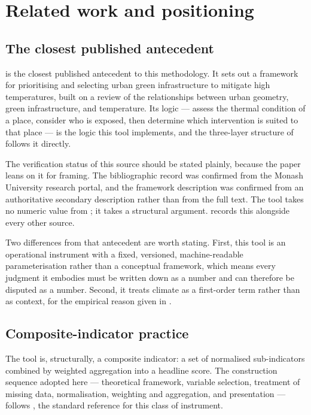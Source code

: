 \section{Related work and positioning}
\label{sec:related}

\subsection{The closest published antecedent}

\textcite{norton2015} is the closest published antecedent to this methodology.
It sets out a framework for prioritising and selecting urban green
infrastructure to mitigate high temperatures, built on a review of the
relationships between urban geometry, green infrastructure, and temperature. Its
logic --- assess the thermal condition of a place, consider who is exposed,
then determine which intervention is suited to that place --- is the logic this
tool implements, and the three-layer structure of  follows
it directly.

The verification status of this source should be stated plainly, because the
paper leans on it for framing. The bibliographic record was confirmed from the
Monash University research portal, and the framework description was confirmed
from an authoritative secondary description rather than from the full text.
The tool takes no numeric value from \textcite{norton2015}; it takes a
structural argument.  records this alongside every other
source.

Two differences from that antecedent are worth stating. First, this tool is an
operational instrument with a fixed, versioned, machine-readable
parameterisation rather than a conceptual framework, which means every
judgment it embodies must be written down as a number and can therefore be
disputed as a number. Second, it treats climate as a first-order term rather
than as context, for the empirical reason given in .

\subsection{Composite-indicator practice}

The tool is, structurally, a composite indicator: a set of normalised
sub-indicators combined by weighted aggregation into a headline score. The
construction sequence adopted here --- theoretical framework, variable
selection, treatment of missing data, normalisation, weighting and
aggregation, and presentation --- follows \textcite{nardo2008}, the standard
reference for this class of instrument.

